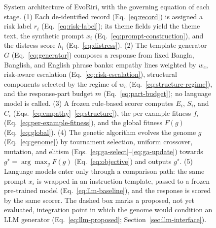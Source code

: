 \documentclass[mathematics,article,submit,xetex,moreauthors]{Definitions/mdpi}
\begin{document}
\begin{figure}[p]
{}
  \caption{System architecture of EvoRiri, with the governing equation of each stage.
  (1) Each
  de-identified record (Eq.~\eqref{eq:record}) is assigned a risk label $r_i$
  (Eq.~\eqref{eq:risk-label}); its theme fields yield the theme text, the synthetic prompt
  $x_i$ (Eq.~\eqref{eq:prompt-construction}), and the distress score $h_i$
  (Eq.~\eqref{eq:distress}).
  (2) The template generator $G$ (Eq.~\eqref{eq:generator}) composes a response from fixed
  Bangla, Banglish, and English phrase banks: empathy lines weighted by $w_e$, risk-aware
  escalation (Eq.~\eqref{eq:risk-escalation}), structural components selected by the regime of
  $w_c$ (Eq.~\eqref{eq:structure-regime}), and the response-part budget $m$ (Eq.~\eqref{eq:part-budget}); no language model is
  called. (3) A frozen rule-based scorer computes $E_i$, $S_i$, and $C_i$
  (Eqs.~\eqref{eq:empathy}--\eqref{eq:structure}), the per-example fitness $f_i$
  (Eq.~\eqref{eq:per-example-fitness}), and the global fitness $F(g)$ (Eq.~\eqref{eq:global}).
  (4) The genetic algorithm evolves the genome $g$ (Eq.~\eqref{eq:genome}) by tournament
  selection, uniform crossover, mutation, and elitism
  (Eqs.~\eqref{eq:ga-select}--\eqref{eq:ga-update}) towards
  $g^{\star}=\arg\max_g F(g)$ (Eq.~\eqref{eq:objective}) and outputs $g^{\star}$.
  (5) Language models enter only through a comparison path: the same prompt $x_i$ is wrapped
  in an instruction template, passed to a frozen pre-trained model (Eq.~\eqref{eq:llm-baseline}),
  and the response is scored by the same scorer. The dashed box marks a proposed, not yet
  evaluated, integration point in which the genome would condition an LLM generator
  (Eq.~\eqref{eq:llm-proposed}; Section~\ref{sec:llm-interface}).}
  \label{fig:pipeline}
\end{figure}
\end{document}
